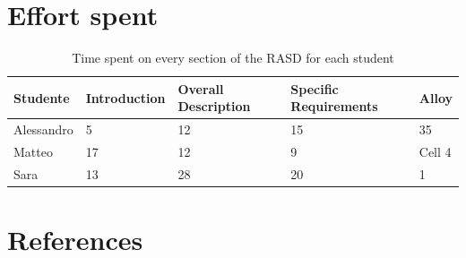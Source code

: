 \documentclass[12pt,a4paper]{article}
\begin{document}
\section{Effort spent}
\begin{table}[h]
  \centering
  \begin{tabular}{|p{1.5cm}|p{1.5cm}|p{1.5cm}|p{1.5cm}|p{1.5cm}|}
    \hline
     Studente & Introduction & Overall Description & Specific Requirements & Alloy \\
    \hline
    Alessandro & 5 & 12 & 15 & 35 \\
    \hline
    Matteo & 17 & 12 & 9 & Cell 4 \\
    \hline
    Sara & 13 & 28 & 20 & 1 \\
    \hline
  \end{tabular}
  \caption{Time spent on every section of the RASD for each student}
  \label{tab:effort}
\end{table}

\section{References}
%
%
\end{document}
